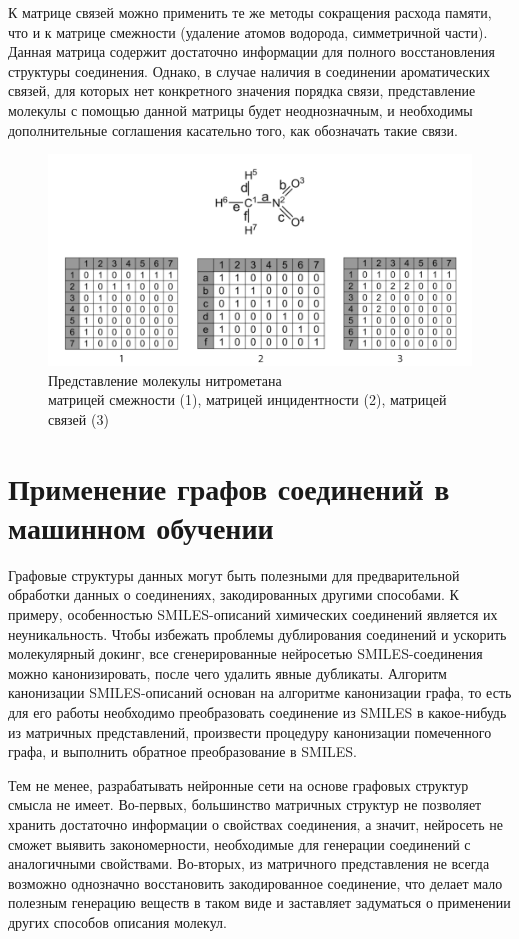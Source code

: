 \documentclass[a4paper,14pt]{extreport}
\begin{document}
К матрице связей можно применить те же методы сокращения расхода памяти, что и к матрице смежности (удаление атомов водорода, симметричной части). Данная матрица содержит достаточно информации для полного восстановления структуры соединения. Однако, в случае наличия в соединении ароматических связей, для которых нет конкретного значения порядка связи, представление молекулы с помощью данной матрицы будет неоднозначным, и необходимы дополнительные соглашения касательно того, как обозначать такие связи.
\begin{figure}[htp]
\centering
\includegraphics[scale=0.35]{images/нитрометан.png}
\caption{Представление молекулы нитрометана \\матрицей смежности (1), матрицей инцидентности (2), матрицей связей (3)}
\label{nitromethane}
\end{figure}

  \section{Применение графов соединений в машинном обучении}
  \label{s:graphs_applications}
Графовые структуры данных могут быть полезными для предварительной обработки данных о соединениях, закодированных другими способами. К примеру, особенностью SMILES-описаний химических соединений является их неуникальность. Чтобы избежать проблемы дублирования соединений и ускорить молекулярный докинг, все сгенерированные нейросетью SMILES-соединения можно канонизировать, после чего удалить явные дубликаты. Алгоритм канонизации SMILES-описаний основан на алгоритме канонизации графа, то есть для его работы необходимо преобразовать соединение из SMILES в какое-нибудь из матричных представлений, произвести процедуру канонизации помеченного графа, и выполнить обратное преобразование в SMILES.

Тем не менее, разрабатывать нейронные сети на основе графовых структур смысла не имеет. Во-первых, большинство матричных структур не позволяет хранить достаточно информации о свойствах соединения, а значит, нейросеть не сможет выявить закономерности, необходимые для генерации соединений с аналогичными свойствами. Во-вторых, из матричного представления не всегда возможно однозначно восстановить закодированное соединение, что делает мало полезным генерацию веществ в таком виде и заставляет задуматься о применении других способов описания молекул.
\end{document}
